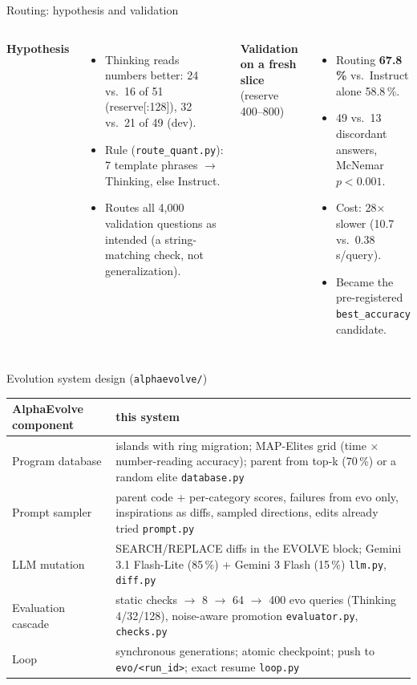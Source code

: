 \documentclass[aspectratio=169,10pt]{beamer}
\newcommand{\file}[1]{\texttt{#1}}
\begin{document}
\begin{frame}{Routing: hypothesis and validation}
\begin{columns}[T]
\textbf{Hypothesis}
\begin{itemize}\small
  \item Thinking reads numbers better: 24 vs.\ 16 of 51 (reserve[:128]), 32 vs.\ 21 of 49 (dev).
  \item Rule (\file{route\_quant.py}): 7 template phrases $\rightarrow$ Thinking, else Instruct.
  \item Routes all 4{,}000 validation questions as intended (a string-matching check, not generalization).
\end{itemize}
\textbf{Validation on a fresh slice} (reserve 400--800)
\begin{itemize}\small
  \item Routing \textbf{67.8\,\%} vs.\ Instruct alone 58.8\,\%.
  \item 49 vs.\ 13 discordant answers, McNemar \textbf{$p<0.001$}.
  \item Cost: 28$\times$ slower (10.7 vs.\ 0.38\,s/query).
  \item Became the pre-registered \texttt{best\_accuracy} candidate.
\end{itemize}
\end{columns}
\end{frame}

\begin{frame}{Evolution system design (\file{alphaevolve/})}
\small
\begin{tabularx}{\linewidth}{@{}lX@{}}
\toprule
AlphaEvolve component & this system \\
\midrule
Program database & islands with ring migration; MAP-Elites grid (time $\times$ number-reading accuracy);
parent from top-k (70\,\%) or a random elite \hfill \file{database.py} \\
Prompt sampler & parent code + per-category scores, failures from evo only, inspirations as diffs, sampled
directions, edits already tried \hfill \file{prompt.py} \\
LLM mutation & SEARCH/REPLACE diffs in the EVOLVE block; Gemini 3.1 Flash-Lite (85\,\%) + Gemini 3 Flash (15\,\%)
\hfill \file{llm.py}, \file{diff.py} \\
Evaluation cascade & static checks $\rightarrow$ 8 $\rightarrow$ 64 $\rightarrow$ 400 evo queries (Thinking 4/32/128),
noise-aware promotion \hfill \file{evaluator.py}, \file{checks.py} \\
Loop & synchronous generations; atomic checkpoint; push to \texttt{evo/<run\_id>}; exact resume
\hfill \file{loop.py} \\
\bottomrule
\end{tabularx}
\end{frame}
\end{document}
